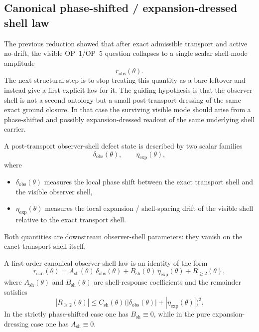 \subsection*{Canonical phase-shifted / expansion-dressed shell law}
The previous reduction showed that after exact admissible transport and active no-drift, the visible OP~1/OP~5 question collapses to a single scalar shell-mode amplitude
\[
  r_{\mathrm{obs}}(\theta).
\]
The next structural step is to stop treating this quantity as a bare leftover and instead give a first explicit law for it. The guiding hypothesis is that the observer shell is not a second ontology but a small post-transport dressing of the same exact ground closure. In that case the surviving visible mode should arise from a phase-shifted and possibly expansion-dressed readout of the same underlying shell carrier.

\begin{definition}
A post-transport observer-shell defect state is described by two scalar families
\[
  \delta_{\mathrm{obs}}(\theta),
  \qquad
  \eta_{\mathrm{exp}}(\theta),
\]
where
\begin{itemize}[leftmargin=2em]
\item $\delta_{\mathrm{obs}}(\theta)$ measures the local phase shift between the exact transport shell and the visible observer shell,
\item $\eta_{\mathrm{exp}}(\theta)$ measures the local expansion / shell-spacing drift of the visible shell relative to the exact transport shell.
\end{itemize}
Both quantities are downstream observer-shell parameters: they vanish on the exact transport shell itself.
\end{definition}

\begin{definition}
A first-order canonical observer-shell law is an identity of the form
\[
  r_{\mathrm{can}}(\theta)
  =A_{\mathrm{sh}}(\theta)\,\delta_{\mathrm{obs}}(\theta)
  +B_{\mathrm{sh}}(\theta)\,\eta_{\mathrm{exp}}(\theta)
  +R_{\ge 2}(\theta),
\]
where $A_{\mathrm{sh}}(\theta)$ and $B_{\mathrm{sh}}(\theta)$ are shell-response coefficients and the remainder satisfies
\[
  |R_{\ge 2}(\theta)|
  \le C_{\mathrm{sh}}(\theta)
  \bigl(|\delta_{\mathrm{obs}}(\theta)|+|\eta_{\mathrm{exp}}(\theta)|\bigr)^2.
\]
In the strictly phase-shifted case one has $B_{\mathrm{sh}}\equiv 0$, while in the pure expansion-dressing case one has $A_{\mathrm{sh}}\equiv 0$.
\end{definition}

